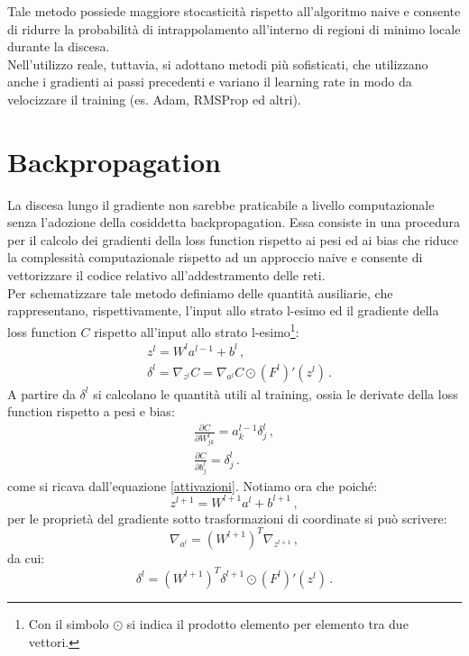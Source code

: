 \documentclass[Lau, noexaminfo, oneside]{sapthesis} %
\begin{document}
Tale metodo possiede maggiore stocasticità rispetto all'algoritmo naive e consente di ridurre la probabilità di intrappolamento all'interno di regioni di minimo locale durante la discesa.\\
Nell'utilizzo reale, tuttavia, si adottano metodi più sofisticati, che utilizzano anche i gradienti ai passi precedenti e variano il learning rate in modo da velocizzare il training (es. Adam, RMSProp ed altri).
\section{Backpropagation} 
La discesa lungo il gradiente non sarebbe praticabile a livello computazionale senza l'adozione della cosiddetta backpropagation. Essa consiste in una procedura per il calcolo dei gradienti della loss function rispetto ai pesi ed ai bias che riduce la complessità computazionale rispetto ad un approccio naive e consente di vettorizzare il codice relativo all'addestramento delle reti.\\
Per schematizzare tale metodo definiamo delle quantità ausiliarie, che rappresentano, rispettivamente, l'input allo strato l-esimo ed il gradiente della loss function $C$ rispetto all'input allo strato l-esimo\footnote{Con il simbolo $\odot$ si indica il prodotto elemento per elemento tra due vettori.}:
\begin{align}
&z^l = W^l a^{l-1} + b^l \,, \\
&\delta^l = \nabla_{z^l} C = \nabla_{a^l} C \odot (F^l)'(z^l) \,.
\end{align}
A partire da $\delta^l$ si calcolano le quantità utili al training, ossia le derivate della loss function rispetto a pesi e bias:
\begin{align}
\frac{\partial C}{\partial W_{jk}^l} = a_k^{l-1} \delta_j^l \,,\\
\frac{\partial C}{\partial b^l_j} = \delta_j^l \,.
\end{align}
come si ricava dall'equazione \eqref{attivazioni}.
Notiamo ora che poiché:
\begin{equation}
z^{l+1} = W^{l+1} a^l+b^{l+1} \,,
\end{equation}
per le proprietà del gradiente sotto trasformazioni di coordinate si può scrivere:
\begin{equation}
\nabla_{a^l} = (W^{l+1})^T \nabla_{z^{l+1}} \,,
\end{equation}
da cui:
\begin{equation}
\delta^l =(W^{l+1})^T \delta^{l+1} \odot (F^l)'(z^l) \,.
\end{equation}
\end{document}
